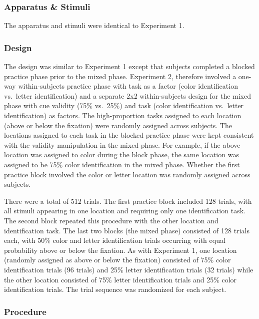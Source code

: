 \documentclass[]{DissertateCUNY}
\begin{document}
\hypertarget{apparatus-stimuli-1}{%
\subsubsection{Apparatus \& Stimuli}\label{apparatus-stimuli-1}}

The apparatus and stimuli were identical to Experiment 1.

\hypertarget{design-1}{%
\subsubsection{Design}\label{design-1}}

The design was similar to Experiment 1 except that subjects completed a
blocked practice phase prior to the mixed phase. Experiment 2, therefore
involved a one-way within-subjects practice phase with task as a factor
(color identification vs.~letter identification) and a separate 2x2
within-subjects design for the mixed phase with cue validity (75\%
vs.~25\%) and task (color identification vs.~letter identification) as
factors. The high-proportion tasks assigned to each location (above or
below the fixation) were randomly assigned across subjects. The
locations assigned to each task in the blocked practice phase were kept
consistent with the validity manipulation in the mixed phase. For
example, if the above location was assigned to color during the block
phase, the same location was assigned to be 75\% color identification in
the mixed phase. Whether the first practice block involved the color or
letter location was randomly assigned across subjects.

There were a total of 512 trials. The first practice block included 128
trials, with all stimuli appearing in one location and requiring only
one identification task. The second block repeated this procedure with
the other location and identification task. The last two blocks (the
mixed phase) consisted of 128 trials each, with 50\% color and letter
identification trials occurring with equal probability above or below
the fixation. As with Experiment 1, one location (randomly assigned as
above or below the fixation) consisted of 75\% color identification
trials (96 trials) and 25\% letter identification trials (32 trials)
while the other location consisted of 75\% letter identification trials
and 25\% color identification trials. The trial sequence was randomized
for each subject.

\hypertarget{procedure-1}{%
\subsubsection{Procedure}\label{procedure-1}}
\end{document}
